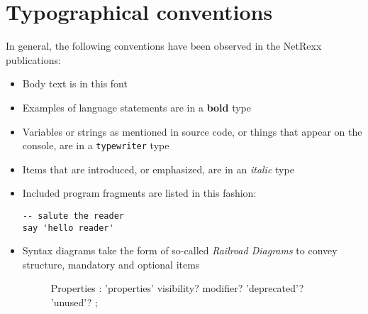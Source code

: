 \chapter{Typographical conventions}
In general, the following conventions have  been observed in the NetRexx publications:
\begin{itemize}
\item Body text is in this font
\item Examples of language statements are in a \textbf{bold} type
\item Variables or strings as mentioned in source code, or things that appear on the console, are in a \texttt{typewriter} type
\item Items that are introduced, or emphasized, are in an \emph{italic} type
\item Included program fragments are listed in this fashion:
\begin{lstlisting}[label=example,caption=Example Listing]
-- salute the reader
say 'hello reader'
\end{lstlisting}
\item Syntax diagrams take the form of so-called \emph{Railroad
    Diagrams} to convey structure, mandatory and optional items
\begin{figure}[h]
\begin{rail}
Properties : 'properties'   visibility? modifier? 'deprecated'? 'unused'?
               ;
\end{rail}
\end{figure}
\end{itemize}